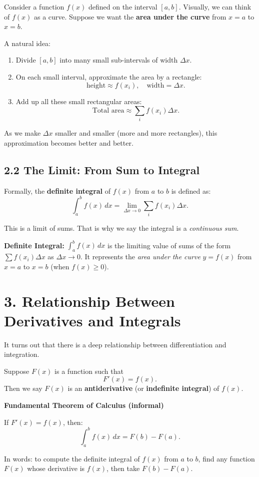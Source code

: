 \documentclass[12pt]{article}
\begin{document}
Consider a function $f(x)$ defined on the interval $[a,b]$. Visually, we can think of $f(x)$ as a curve. Suppose we want the \textbf{area under the curve} from $x=a$ to $x=b$.

A natural idea:
\begin{enumerate}
\item Divide $[a,b]$ into many small sub-intervals of width $\Delta x$.
\item On each small interval, approximate the area by a rectangle:
\[
\text{height} \approx f(x_i), \quad \text{width} = \Delta x.
\]
\item Add up all these small rectangular areas:
\[
\text{Total area} \approx \sum_i f(x_i)\Delta x.
\]
\end{enumerate}
As we make $\Delta x$ smaller and smaller (more and more rectangles), this approximation becomes better and better.

\subsection*{2.2 The Limit: From Sum to Integral}

Formally, the \textbf{definite integral} of $f(x)$ from $a$ to $b$ is defined as:
\[
\int_a^b f(x)\,dx = \lim_{\Delta x \to 0} \sum_i f(x_i)\Delta x.
\]

This is a limit of sums. That is why we say the integral is a \emph{continuous sum}.

\begin{tcolorbox}
\textbf{Definite Integral:} $\displaystyle \int_a^b f(x)\,dx$ is the limiting value of sums of the form $\sum f(x_i)\Delta x$ as $\Delta x\to 0$. It represents the \emph{area under the curve} $y=f(x)$ from $x=a$ to $x=b$ (when $f(x)\ge 0$).
\end{tcolorbox}
\newpage
\section*{3. Relationship Between Derivatives and Integrals}

It turns out that there is a deep relationship between differentiation and integration.

Suppose $F(x)$ is a function such that 
\[
F'(x) = f(x).
\]
Then we say $F(x)$ is an \textbf{antiderivative} (or \textbf{indefinite integral}) of $f(x)$.

\begin{tcolorbox}
\textbf{Fundamental Theorem of Calculus (informal)}  

If $F'(x) = f(x)$, then:
\[
\int_a^b f(x)\, dx = F(b) - F(a).
\]

In words: to compute the definite integral of $f(x)$ from $a$ to $b$, find any function $F(x)$ whose derivative is $f(x)$, then take $F(b)-F(a)$.
\end{tcolorbox}
\end{document}
